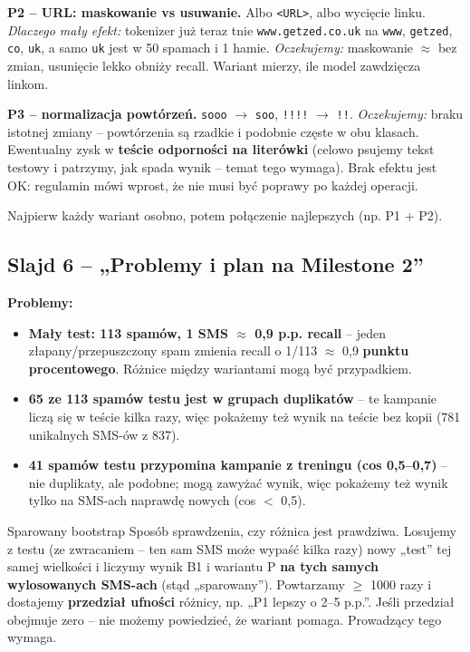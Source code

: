 \documentclass[11pt,a4paper]{article}
\begin{document}
\textbf{P2 -- URL: maskowanie vs usuwanie.} Albo \texttt{<URL>}, albo wycięcie linku. \textit{Dlaczego mały efekt:}
tokenizer już teraz tnie \texttt{www.getzed.co.uk} na \texttt{www}, \texttt{getzed}, \texttt{co}, \texttt{uk}, a samo
\texttt{uk} jest w 50 spamach i 1 hamie. \textit{Oczekujemy:} maskowanie $\approx$ bez zmian, usunięcie lekko obniży recall.
Wariant mierzy, ile model zawdzięcza linkom.

\textbf{P3 -- normalizacja powtórzeń.} \texttt{sooo} $\to$ \texttt{soo}, \texttt{!!!!} $\to$ \texttt{!!}.
\textit{Oczekujemy:} braku istotnej zmiany -- powtórzenia są rzadkie i podobnie częste w obu klasach. Ewentualny zysk
w \textbf{teście odporności na literówki} (celowo psujemy tekst testowy i patrzymy, jak spada wynik -- temat tego wymaga).
Brak efektu jest OK: regulamin mówi wprost, że nie musi być poprawy po każdej operacji.

Najpierw każdy wariant osobno, potem połączenie najlepszych (np. P1 + P2).

\subsection{Slajd 6 -- „Problemy i plan na Milestone 2”}

\textbf{Problemy:}
\begin{itemize}
  \item \textbf{Mały test: 113 spamów, 1 SMS $\approx$ 0,9 p.p. recall} -- jeden złapany/przepuszczony spam zmienia recall
        o 1/113 $\approx$ 0,9 \textbf{punktu procentowego}. Różnice między wariantami mogą być przypadkiem.
  \item \textbf{65 ze 113 spamów testu jest w grupach duplikatów} -- te kampanie liczą się w teście kilka razy, więc
        pokażemy też wynik na teście bez kopii (781 unikalnych SMS-ów z 837).
  \item \textbf{41 spamów testu przypomina kampanie z treningu (cos 0,5--0,7)} -- nie duplikaty, ale podobne; mogą zawyżać
        wynik, więc pokażemy też wynik tylko na SMS-ach naprawdę nowych (cos $<$ 0,5).
\end{itemize}

\begin{pojecie}{Sparowany bootstrap}
Sposób sprawdzenia, czy różnica jest prawdziwa. Losujemy z testu (ze zwracaniem -- ten sam SMS może wypaść kilka razy)
nowy „test” tej samej wielkości i liczymy wynik B1 i wariantu P \textbf{na tych samych wylosowanych SMS-ach} (stąd
„sparowany”). Powtarzamy $\geq$ 1000 razy i dostajemy \textbf{przedział ufności} różnicy, np. „P1 lepszy o 2--5 p.p.”.
Jeśli przedział obejmuje zero -- nie możemy powiedzieć, że wariant pomaga. Prowadzący tego wymaga.
\end{pojecie}
\end{document}

